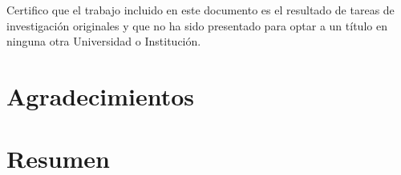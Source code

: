 \documentclass[spanish,a4paper,oneside,10pt,openright]{book}
\begin{document}
 \cleardoublepage


Certifico que el trabajo incluido en este documento es el resultado de tareas de investigación originales y que no ha sido presentado para optar a un título en ninguna otra Universidad o Institución.

\vspace{3cm}
\begin{flushright}
\tfcAuthor
\end{flushright}
\cleardoublepage




\clearpage
\thispagestyle{empty}
\phantom{p. 2}
\clearpage

\chapter*{Agradecimientos} %



\phantom{p. 1}
\clearpage
\thispagestyle{empty}
\phantom{p. 2}
\clearpage

\chapter*{Resumen} %


\phantom{p. 1}
\clearpage
\thispagestyle{empty}
\end{document}
